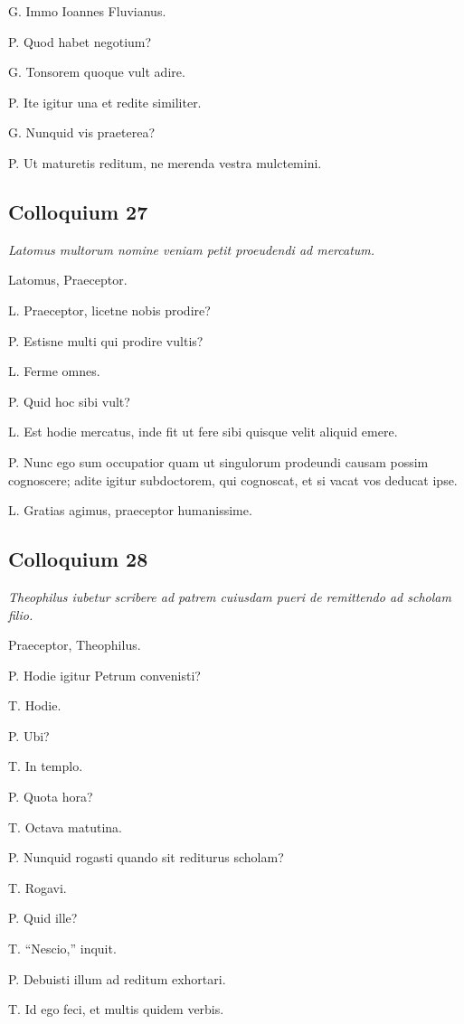 \documentclass{article}
\begin{document}
G. Immo Ioannes Fluvianus.

P. Quod habet negotium?

G. Tonsorem quoque vult adire.

P. Ite igitur una et redite similiter.

G. Nunquid vis praeterea?

P. Ut maturetis reditum, ne merenda vestra mulctemini.

\subsection{Colloquium 27}
\emph{Latomus multorum nomine veniam petit proeudendi ad mercatum.}

Latomus, Praeceptor.

L. Praeceptor, licetne nobis prodire?

P. Estisne multi qui prodire vultis?

L. Ferme omnes.

P. Quid hoc sibi vult?

L. Est hodie mercatus, inde fit ut fere sibi quisque velit aliquid emere.

P. Nunc ego sum occupatior quam ut singulorum prodeundi causam possim cognoscere; adite igitur subdoctorem, qui cognoscat, et si vacat vos deducat ipse.

L. Gratias agimus, praeceptor humanissime.

\subsection{Colloquium 28}
\emph{Theophilus iubetur scribere ad patrem cuiusdam pueri de remittendo ad scholam filio.}

Praeceptor, Theophilus.

P. Hodie igitur Petrum convenisti?

T. Hodie.

P. Ubi?

T. In templo.

P. Quota hora?

T. Octava matutina.

P. Nunquid rogasti quando sit rediturus scholam?

T. Rogavi.

P. Quid ille?

T. ``Nescio,'' inquit.

P. Debuisti illum ad reditum exhortari.

T. Id ego feci, et multis quidem verbis.
\end{document}
